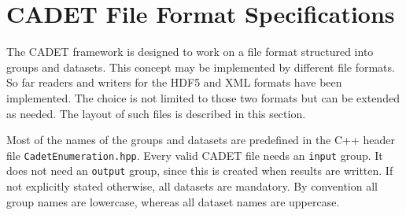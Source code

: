 %  
%                                      
%  

\section{CADET File Format Specifications}
The CADET framework is designed to work on a file format structured into groups and datasets. This
concept may be implemented by different file formats.
So far readers and writers for the HDF5 and XML formats have been implemented. The choice is not
limited to those two formats but can be extended as needed.
The layout of such files is described in this section. 

Most of the names of the groups and datasets are predefined in the C++ header file
\texttt{CadetEnumeration.hpp}.
Every valid CADET file needs an \texttt{input} group. It does not need an \texttt{output} group,
since this is created when results are written. If not explicitly stated otherwise, all datasets
are mandatory. By convention all group names are lowercase, whereas all dataset names are uppercase.

